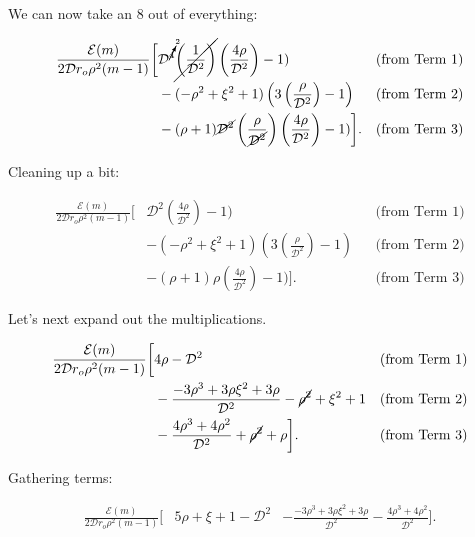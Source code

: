 \noindent We can now take an 8 out of everything:

\begin{equation}
    \begin{aligned}
        \frac{\mathcal{E}(m)}{2\mathcal{D}r_o\rho^2(m-1)} \bigg[&  \mathcal{D}^{\cancelto{2}{4}}\cancel{\left(\frac{1}{\mathcal{D}^2}\right)}\left(\frac{4\rho}{\mathcal{D}^2}\right)-1)  && \text{(from Term 1)} \\
      &- (-\rho^2+\xi^2+1)\left(3\left(\frac{\rho}{\mathcal{D}^2}\right)-1\right) && \text{(from Term 2)} \\
      &- (\rho+1)\cancel{\mathcal{D}^2}\left(\frac{\rho}{\cancel{\mathcal{D}^2}}\right)\left(\frac{4\rho}{\mathcal{D}^2}\right)-1) \bigg]. && \text{(from Term 3)}
    \end{aligned}
\end{equation}

\noindent Cleaning up a bit:

\begin{equation}
    \begin{aligned}
        \frac{\mathcal{E}(m)}{2\mathcal{D}r_o\rho^2(m-1)} \bigg[&  \mathcal{D}^2\left(\frac{4\rho}{\mathcal{D}^2}\right)-1)  && \text{(from Term 1)} \\
      &- (-\rho^2+\xi^2+1)\left(3\left(\frac{\rho}{\mathcal{D}^2}\right)-1\right) && \text{(from Term 2)} \\
      &- (\rho+1)\rho\left(\frac{4\rho}{\mathcal{D}^2}\right)-1) \bigg]. && \text{(from Term 3)}
    \end{aligned}
\end{equation}

\noindent Let's next expand out the multiplications.

\begin{equation}
    \begin{aligned}
        \frac{\mathcal{E}(m)}{2\mathcal{D}r_o\rho^2(m-1)} \bigg[&  4\rho-\mathcal{D}^2  && \text{(from Term 1)} \\
      &- \frac{-3\rho^3+3\rho\xi^2+3\rho}{\mathcal{D}^2} -\cancel{\rho^2}+\xi^2 +1 && \text{(from Term 2)} \\
      &- \frac{4\rho^3 + 4\rho^2}{\mathcal{D}^2}+\cancel{\rho^2}+\rho \bigg]. && \text{(from Term 3)}
    \end{aligned}
\end{equation}

\noindent Gathering terms:

\begin{equation}
    \begin{aligned}
        \frac{\mathcal{E}(m)}{2\mathcal{D}r_o\rho^2(m-1)} \bigg[&  5\rho+\xi+1-\mathcal{D}^2
      &- \frac{-3\rho^3+3\rho\xi^2+3\rho}{\mathcal{D}^2}- \frac{4\rho^3 + 4\rho^2}{\mathcal{D}^2} \bigg].
    \end{aligned}
\end{equation}

